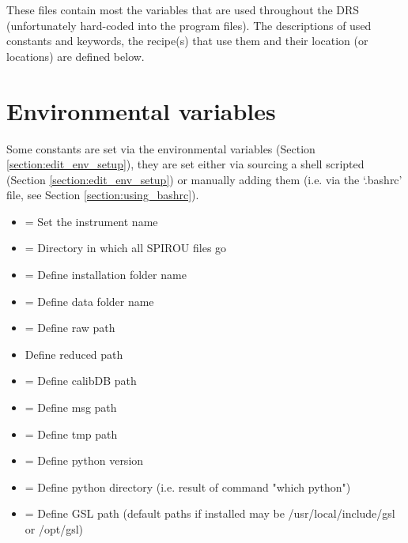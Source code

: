 \noindent These files contain most the variables that are used throughout the DRS (unfortunately hard-coded into the program files). The descriptions of used constants and keywords, the recipe(s) that use them and their location (or locations) are defined below.



\section{Environmental variables}
\label{section:the_env_variables}

Some constants are set via the environmental variables (Section \ref{section:edit_env_setup}), they are set either via sourcing a shell scripted (Section \ref{section:edit_env_setup}) or manually adding them (i.e. via the `.bashrc' file, see Section \ref{section:using_bashrc}).

\begin{itemize}
\item {} = Set the instrument name
\item {}= Directory in which all SPIROU files go
\item {} = Define installation folder name
\item {} = Define data folder name
\item {} = Define raw path
\item {} Define reduced path
\item {} = Define calibDB path
\item {} = Define msg path
\item {} = Define tmp path
\item {} = Define python version
\item {} = Define python directory (i.e. result of command "which python")
\item {} = Define GSL path (default paths if installed may be /usr/local/include/gsl or /opt/gsl)
\end{itemize}

